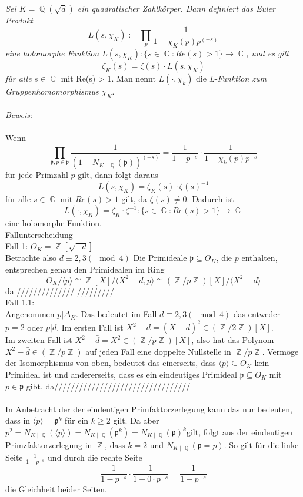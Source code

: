 \documentclass[10pt,a4paper]{article}
\DeclareMathOperator{\C}{\mathbb{C}}
\DeclareMathOperator{\Q}{\mathbb{Q}}
\DeclareMathOperator{\Z}{\mathbb{Z}}
\begin{document}
\textit{Sei $K=\Q(\sqrt{d})$ ein quadratischer Zahlkörper. Dann definiert das Euler Produkt $$L(s,\chi_K) := \prod_{p}\frac{1}{1-\chi_K(p)p^{(-s)}} $$ eine holomorphe Funktion $L(s,\chi_K) \colon \{s \in \C \colon Re(s) > 1\} \rightarrow \C$, und es gilt $$\zeta_K(s) = \zeta(s)\cdot L(s,\chi_K) $$ für alle }$s \in \C$ mit Re(s) > 1. Man nennt $L(\cdot,\chi_k)$ die \textit{L-Funktion zum Gruppenhomomorphismus $\chi_K$}.
\\
\\
\textit{Beweis}: 
\\
\\
Wenn $$\prod_{\mathfrak{p},p \in \mathfrak{p}}\frac{1}{(1- N_{K\mid \Q}(\mathfrak{p}))^{(-s)}}= \frac{1}{1-p^{-s}}\cdot\frac{1}{1-\chi_k(p)p^{-s}}$$ für jede Primzahl $p$ gilt, dann folgt daraus $$L(s,\chi_K)= \zeta_K(s)\cdot \zeta(s)^{-1}$$ für alle $s \in \C$ mit $Re(s)>1$ gilt, da $\zeta(s) \neq 0$. Dadurch ist $$L(\cdot,\chi_K)= \zeta_K\cdot \zeta^{-1}\colon \{s \in \C \colon Re(s)>1\}\rightarrow \C$$ eine holomorphe Funktion.
\\
Fallunterscheidung
\\
Fall 1: $O_K= \Z[\sqrt{-d}]$
\\
Betrachte also $d\equiv2,3 (\mod 4)$
Die Primideale $\mathfrak{p} \subseteq O_K$, die $p$ enthalten, entsprechen genau den Primidealen im Ring $$O_K /\langle p\rangle \cong \Z[X] /\langle X^2-d,p\rangle \cong (\Z/p\Z)[X]/\langle X^2-\bar{d}\rangle $$da //////////////
/////////
\\
Fall 1.1:
\\
Angenommen $p | \Delta_K$. Das bedeutet im Fall $d \equiv2,3 (\mod 4)$ das entweder $p = 2$ oder $p|d$. Im ersten Fall ist $X^2-\bar{d} = (X-\bar{d})^2 \in (\Z/2\Z)[X]$.
\\
Im zweiten Fall ist $X^2-\bar{d} = X^2 \in (\Z/p\Z)[X]$, also hat das Polynom $X^2-\bar{d} \in (\Z/p\Z)$ auf jeden Fall eine doppelte Nullstelle in $\Z/p\Z$. Vermöge der Isomorphismus von oben, bedeutet das einerseits, dass $\langle p\rangle \subseteq O_K$ kein Primideal ist und andererseits, dass es ein eindeutiges Primideal $\mathfrak{p} \subseteq O_K$ mit $p \in \mathfrak{p}$ gibt, da/////////////////////////////////
\\
\\
In Anbetracht der der eindeutigen Primfaktorzerlegung kann das nur bedeuten, dass in $\langle p\rangle =\mathfrak{p}^k$ für ein $k\geq 2$ gilt. Da aber $p^2=N_{K\mid \Q}(\langle p\rangle)=N_{K\mid \Q}(\mathfrak{p}^k) =N_{K\mid \Q}(\mathfrak{p})^k $gilt, folgt aus der eindeutigen Primzfaktorzerlegung in $\Z$, dass $k = 2$ und $N_{K\mid\Q}(\mathfrak{p}=p)$. So gilt für die linke Seite $\frac{1}{1-p^{-s}}$ und durch die rechte Seite $$\frac{1}{1-p^{-s}}\cdot \frac{1}{1-0\cdot p^{-s}}=\frac{1}{1-p^{-s}}$$ die Gleichheit beider Seiten.
\end{document}
